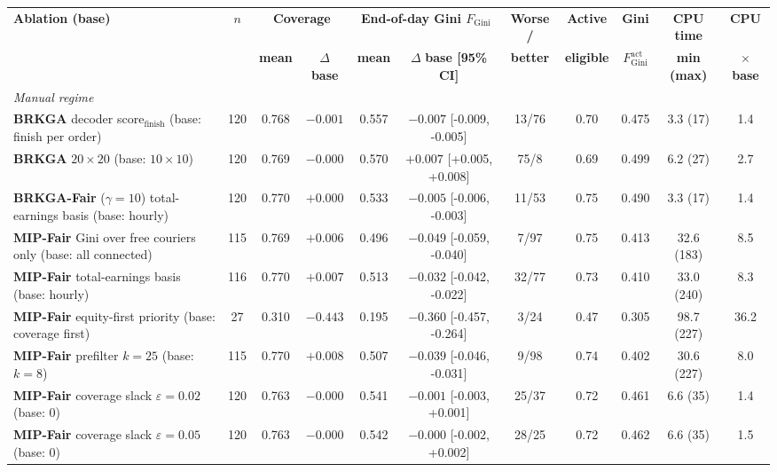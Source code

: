 \documentclass[a4paper,11pt,review,3p,authoryear]{elsarticle}
\newcommand{\FG}{F_{\text{Gini}}}
\newcommand{\FGa}{F_{\text{Gini}}^{\text{act}}}
\begin{document}
\begin{table}
\centering
\begin{adjustbox}{max width=\textheight}
\begin{tabular}{l|c|cc|cc|c|c|c|c|c}
\hline
\multirow{2}{*}{\textbf{Ablation (base)}} & \multirow{2}{*}{$n$} & \multicolumn{2}{c|}{\textbf{Coverage}} & \multicolumn{2}{c|}{\textbf{End-of-day Gini $\FG$}} & \textbf{Worse /} & \textbf{Active} & \textbf{Gini} & \textbf{CPU time} & \textbf{CPU} \\
 & & \textbf{mean} & $\Delta$ \textbf{base} & \textbf{mean} & $\Delta$ \textbf{base [95\% CI]} & \textbf{better} & \textbf{eligible} & $\FGa$ & \textbf{min (max)} & $\times$ \textbf{base} \\
\hline
\multicolumn{11}{l}{\textit{Manual regime}} \\
\textbf{BRKGA} decoder score$_{\text{finish}}$ (base: finish per order) & 120 & 0.768 & $-0.001$ & 0.557 & $-0.007$ [-0.009, -0.005] & 13/76 & 0.70 & 0.475 & 3.3 (17) & 1.4 \\
\textbf{BRKGA} $20 \times 20$ (base: $10 \times 10$) & 120 & 0.769 & $-0.000$ & 0.570 & $+0.007$ [+0.005, +0.008] & 75/8 & 0.69 & 0.499 & 6.2 (27) & 2.7 \\
\textbf{BRKGA-Fair} ($\gamma = 10$) total-earnings basis (base: hourly) & 120 & 0.770 & $+0.000$ & 0.533 & $-0.005$ [-0.006, -0.003] & 11/53 & 0.75 & 0.490 & 3.3 (17) & 1.4 \\
\textbf{MIP-Fair} Gini over free couriers only (base: all connected) & 115 & 0.769 & $+0.006$ & 0.496 & $-0.049$ [-0.059, -0.040] & 7/97 & 0.75 & 0.413 & 32.6 (183) & 8.5 \\
\textbf{MIP-Fair} total-earnings basis (base: hourly) & 116 & 0.770 & $+0.007$ & 0.513 & $-0.032$ [-0.042, -0.022] & 32/77 & 0.73 & 0.410 & 33.0 (240) & 8.3 \\
\textbf{MIP-Fair} equity-first priority (base: coverage first) & 27 & 0.310 & $-0.443$ & 0.195 & $-0.360$ [-0.457, -0.264] & 3/24 & 0.47 & 0.305 & 98.7 (227) & 36.2 \\
\textbf{MIP-Fair} prefilter $k = 25$ (base: $k = 8$) & 115 & 0.770 & $+0.008$ & 0.507 & $-0.039$ [-0.046, -0.031] & 9/98 & 0.74 & 0.402 & 30.6 (227) & 8.0 \\
\textbf{MIP-Fair} coverage slack $\varepsilon = 0.02$ (base: $0$) & 120 & 0.763 & $-0.000$ & 0.541 & $-0.001$ [-0.003, +0.001] & 25/37 & 0.72 & 0.461 & 6.6 (35) & 1.4 \\
\textbf{MIP-Fair} coverage slack $\varepsilon = 0.05$ (base: $0$) & 120 & 0.763 & $-0.000$ & 0.542 & $-0.000$ [-0.002, +0.002] & 28/25 & 0.72 & 0.462 & 6.6 (35) & 1.5 \\

\end{tabular}
\end{adjustbox}
\end{table}
\end{document}
